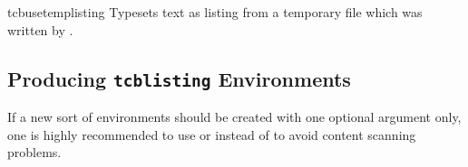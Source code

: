 \begin{docCommand}{tcbusetemplisting}{}
  Typesets text as listing from a temporary file which was written by
  .
\end{docCommand}


\clearpage
\subsection{Producing \texttt{tcblisting} Environments}\label{subsec:listing_newlistings}

\begin{marker}
If a new sort of  environments should be created with
one optional argument only, one is highly recommended to use
 or 
instead of  to
avoid content scanning problems.
\end{marker}

